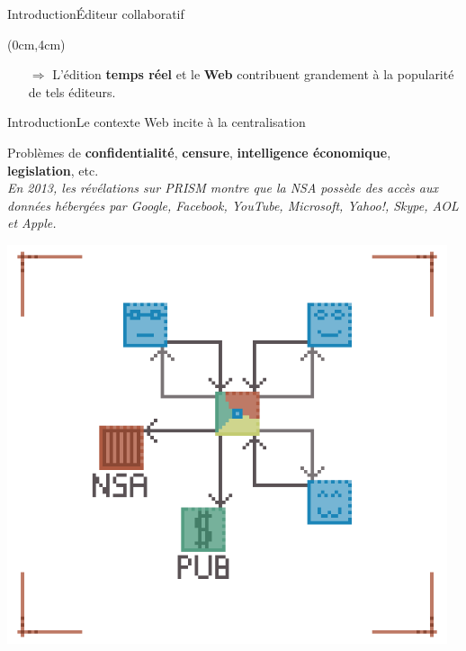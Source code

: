 \begin{frame}{Introduction}{Éditeur collaboratif}
  \begin{textblock*}{\textwidth}(0cm,4cm)
    \large
    \begin{itemize}
    \item[$\Rightarrow$] L'édition \textbf{temps réel} et le \textbf{Web}
      contribuent grandement à la popularité de tels éditeurs.
    \end{itemize}    
  \end{textblock*}
\end{frame}


\begin{frame}{Introduction}{Le contexte Web incite à la centralisation}
  
  \begin{minipage}{0.69\textwidth}
    Problèmes de \textbf{confidentialité}, \textbf{censure},
    \textbf{intelligence économique}, \textbf{legislation}, etc. \vspace{0.15cm}\\
    \textit{En 2013, les révélations sur PRISM montre que la NSA possède des
      accès aux données hébergées par Google, Facebook, YouTube, Microsoft,
      Yahoo!, Skype, AOL et Apple.}
  \end{minipage}
  \hfill
  \begin{minipage}{0.3\textwidth}
    \hfill
    \includegraphics[width=0.97\textwidth]{img/centralizedethicproblems.png}
  \end{minipage}


\end{frame}
